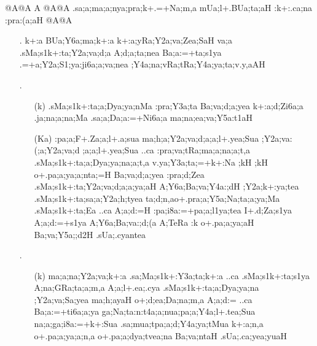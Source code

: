 \begin{spacing}{1.15}
{\sktf {}@A@A A @A@A .sa;a;ma;a;nya;pra;k+.=+Na;m,a
\ZF{-} mUa;l+.BUa;ta;aH :k+:.ca;na
:pra:(a;aH @A@A}

\begin{itemize}
  \item[{\sktf 1}.] {\sktf k+:a BUa;Y6a;ma;k+:a k+:a;yRa;Y2a;va;Zea;SaH
va;a .sMa;s1k+:ta;Y2a;va;d;a A;d;a;ta;nea
Ba;a:=+ta;s1ya .=+a;Y2a;S1;ya:ji6a;a;va;nea
;Y4a;na;vRa;tRa;Y4a;ya;ta;v.y,aAH }  
  
  \item[{\sktf 2}.] \begin{itemize} 
    \item[({\sktf k})] {\sktf .sMa;s1k+:ta;a;Dya;ya;nMa
:pra;Y3a;ta Ba;va;d;a;yea k+:a;d;Zi6a;a .ja;na;a;na;Ma .sa;a;Da;a:=+Ni6a;a
ma;na;ea;va;Y5a:t1aH }
                        
    \item[({\sktf Ka})] {\sktf :pa;a;F+.Za;a;l+.a;sua\ZF{,}
ma;h;a;Y2a;va;d;a;a;l+.yea;Sua\ZF{,} ;Y2a;va:(;a;Y2a;va;d%
;a;a;l+.yea;Sua ..ca :pra;va;tRa;ma;a;na;a;t,a
.sMa;s1k+:ta;a;Dya;ya;na;a;t,a {v.ya};Y3a;ta;=+k+:Na\ZF{,} ;kH
;kH o+.pa;a;ya;a;nta;=H
Ba;va;d;a;yea :pra;d;Zea .sMa;s1k+:ta;Y2a;va;d;a;a;ya;aH
A;Y6a;Ba;va;Y4a:;dH ;Y2a;k+:ya;tea\ZF{,}
.sMa;s1k+:ta;sa;a;Y2a;h;tyea ta;d;n,ao+.pra;a;Y5a;Na;ta;a;ya;Ma .sMa;s1k+:ta;Ea ..ca
A;a;d:=H :pa;i8a:=+pa;a;l1ya;tea 
I+.d;Za;s1ya A;a;d:=+s1ya
A;Y6a;Ba;va:;d;(a A;TeRa
:k o+.pa;a;ya;aH Ba;va;Y5a;;d2H
.sUa;.cyantea }
     \end{itemize}
                       
 \item[{\sktf 3}.] \begin{itemize}
      \item[({\sktf k})] {\sktf ma;a;na;Y2a;va;k+:a
.sa;Ma;s1k+:Y3a;ta;k+:a ..ca
.sMa;s1k+:ta;s1ya A;na;GRa;ta;a;m,a A;a;l+.ea;.cya\ZF{,}
.sMa;s1k+:ta;a;Dya;ya;na ;Y2a;va;Sa;yea ma{;h;a}}{\sktf yaH} {\sktf o+;d;ea;Da;na;m,a A;a;d:= ..ca
Ba;a:=+ti6a;a;ya ga;Na;ta:n:t4a;a;nua;pa;a;Y4a;l+.tea;Sua
na;a;ga;i8a:=+k+:Sua .sa;mua;tpa;a;d;Y4a;ya;tMua k+:a;n,a
o+.pa;a;ya;a;n,a o+.pa;a;dya;tvea;na Ba;va;ntaH .sUa;.ca;yea;yuaH}
                      

\end{itemize}
\end{itemize}
\end{spacing}
